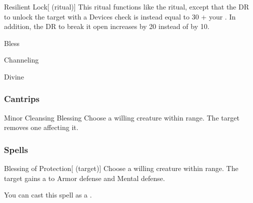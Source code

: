 \lowercase{\hypertarget{spell:Resilient Lock}{}}\label{spell:Resilient Lock}
\begin{attuneability}[\nth{4}]{\hypertarget{spell:Resilient Lock}{Resilient Lock}}[ (ritual)]
This ritual functions like the  ritual, except that the DR to unlock the target with a Devices check is instead equal to 30 + your .
In addition, the DR to break it open increases by 20 instead of by 10.
\end{attuneability}
\vspace{0.25em}


\newpage
\begin{spellsection}{Bless}

\begin{spellheader}
\end{spellheader}


 Channeling

 Divine

\subsubsection{Cantrips}


\begin{freeability}{Minor Cleansing Blessing}
Choose a willing creature within \rngclose range.
The target removes one  affecting it.
\end{freeability}

\end{spellsection}


\subsubsection{Spells}


\lowercase{\hypertarget{spell:Blessing of Protection}{}}\label{spell:Blessing of Protection}
\begin{attuneability}[\nth{1}]{\hypertarget{spell:Blessing of Protection}{Blessing of Protection}}[ (target)]
Choose a willing creature within \rngclose range.
The target gains a   to Armor defense and Mental defense.

You can cast this spell as a .
\end{attuneability}
\vspace{0.25em}



